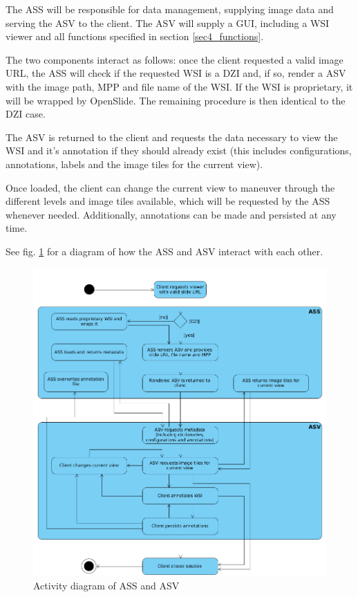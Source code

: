 The ASS will be responsible for data management, supplying image data and serving the ASV to the client. The ASV will supply a GUI, including a WSI viewer and all functions specified in section \ref{sec4_functions}.

The two components interact as follows: once the client requested a valid image URL, the ASS will check if the requested WSI is a DZI and, if so, render a ASV with the image path, MPP and file name of the WSI. If the WSI is proprietary, it will be wrapped by OpenSlide. The remaining procedure is then identical to the DZI case.

The ASV is returned to the client and requests the data necessary to view the WSI and it's annotation if they should already exist (this includes configurations, annotations, labels and the image tiles for the current view).

Once loaded, the client can change the current view to maneuver through the different levels and image tiles available, which will be requested by the ASS whenever needed. Additionally, annotations can be made and persisted at any time.

See fig. \ref{fig4_asUml} for a diagram of how the ASS and ASV interact with each other.

\begin{figure}[!h]
	\begin{center}
		\includegraphics[scale=0.4]{img/asUML.png}
		\caption{Activity diagram of ASS and ASV}
		\label{fig4_asUml}
	\end{center}
\end{figure}

